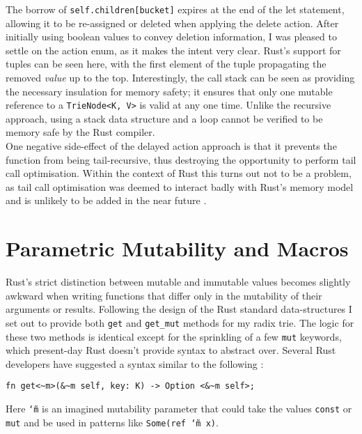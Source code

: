 \documentclass[a4paper,12pt]{article}
\newcommand{\code}[1]{\texttt{#1}}
\newcommand{\tildex}{\char`\~}
\begin{document}
The borrow of \code{self.children[bucket]} expires at the end of the let statement, allowing it to be re-assigned or deleted when applying the delete action. After initially using boolean values to convey deletion information, I was pleased to settle on the action enum, as it makes the intent very clear. Rust's support for tuples can be seen here, with the first element of the tuple propagating the removed \textit{value} up to the top. Interestingly, the call stack can be seen as providing the necessary insulation for memory safety; it ensures that only one mutable reference to a \code{TrieNode<K, V>} is valid at any one time. Unlike the recursive approach, using a stack data structure and a loop cannot be verified to be memory safe by the Rust compiler.\\

One negative side-effect of the delayed action approach is that it prevents the function from being tail-recursive, thus destroying the opportunity to perform tail call optimisation. Within the context of Rust this turns out not to be a problem, as tail call optimisation was deemed to interact badly with Rust's memory model and is unlikely to be added in the near future \cite{issue-tail-calls}.

\section{Parametric Mutability and Macros}

Rust's strict distinction between mutable and immutable values becomes slightly awkward when writing functions that differ only in the mutability of their arguments or results. Following the design of the Rust standard data-structures I set out to provide both \code{get} and \code{get\_mut} methods for my radix trie. The logic for these two methods is identical except for the sprinkling of a few \code{mut} keywords, which present-day Rust doesn't provide syntax to abstract over. Several Rust developers have suggested a syntax similar to the following \cite{parametric-mutability}:

\begin{verbatim}
fn get<~m>(&~m self, key: K) -> Option <&~m self>;
\end{verbatim}

Here \code{\tildex m} is an imagined mutability parameter that could take the values \code{const} or \code{mut} and be used in patterns like \code{Some(ref \tildex m x)}.\\
\end{document}
